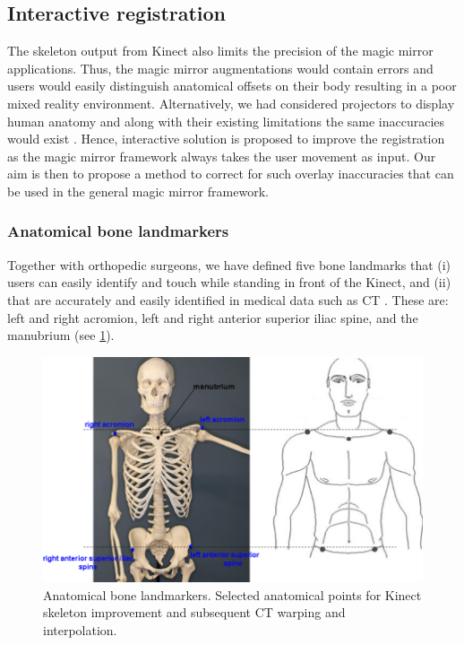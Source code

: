\subsection{Interactive registration}
The skeleton output from Kinect also limits the precision of the magic mirror applications. Thus, the magic mirror augmentations would contain errors and users would easily distinguish anatomical offsets on their body resulting in a poor mixed reality environment. Alternatively, we had considered projectors to display human anatomy and along with their existing limitations the same inaccuracies would exist \cite{Sun2013}. 
Hence, interactive solution is proposed to improve the registration as the magic mirror framework always takes the user movement as input.
Our aim is then to propose a method to correct for such overlay inaccuracies that can be used in the general magic mirror framework. 

\subsubsection{Anatomical bone landmarkers}
Together with orthopedic surgeons, we have defined five bone landmarks that (i) users can easily identify and touch while standing in front of the Kinect, and (ii) that are accurately and easily identified in medical data such as CT \cite{ma2013ismar}. These are: left and right acromion, left and right anterior superior iliac spine, and the manubrium (see \figurename{\ref{fig:3-PRMM:bonelandmarker}}).
\begin{figure}[htb]
	\centering
	\includegraphics[width = 0.75\linewidth]{figures/3-PRMM/FiveBoneLandmarker.png}
	\caption{Anatomical bone landmarkers. Selected anatomical points for Kinect skeleton improvement and subsequent CT warping and interpolation.}
	\label{fig:3-PRMM:bonelandmarker}
\end{figure}

